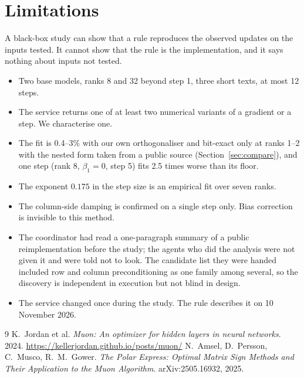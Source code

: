 \documentclass[11pt]{article}
\begin{document}
\section{Limitations}
A black-box study can show that a rule reproduces the observed updates on the inputs tested. It
cannot show that the rule is the implementation, and it says nothing about inputs not tested.
\begin{itemize}
\item Two base models, ranks 8 and 32 beyond step 1, three short texts, at most 12 steps.
\item The service returns one of at least two numerical variants of a gradient or a step. We
characterise one.
\item The fit is 0.4--3\% with our own orthogonaliser and bit-exact only at ranks 1--2 with
the nested form taken from a public source (Section~\ref{sec:compare}),
and one step (rank 8, $\beta_1=0$, step 5) fits 2.5 times worse than its floor.
\item The exponent $0.175$ in the step size is an empirical fit over seven ranks.
\item The column-side damping is confirmed on a single step only. Bias correction is invisible
to this method.
\item The coordinator had read a one-paragraph summary of a public reimplementation before the
study; the agents who did the analysis were not given it and were told not to look. The
candidate list they were handed included row and column preconditioning as one family among
several, so the discovery is independent in execution but not blind in design.
\item The service changed once during the study. The rule describes it on 10 November 2026.
\end{itemize}

\begin{thebibliography}{9}
 K.~Jordan et al. \emph{Muon: An optimizer for hidden layers in neural
networks}. 2024. \url{https://kellerjordan.github.io/posts/muon/}
 N.~Amsel, D.~Persson, C.~Musco, R.~M.~Gower. \emph{The Polar Express:
Optimal Matrix Sign Methods and Their Application to the Muon Algorithm}. arXiv:2505.16932, 2025.
\end{thebibliography}
\end{document}
